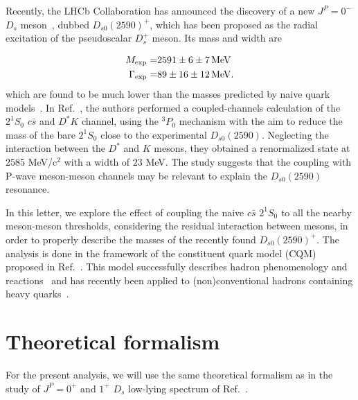 \documentclass[aps, prd, floatfix, twocolumn, superscriptaddress, nofootinbib]{revtex4-1}
\begin{document}
Recently, the LHCb Collaboration has announced the discovery of a new $J^P=0^-$ $D_s$ meson~\cite{LHCb:2020gnv}, dubbed $D_{s0}(2590)^+$, which has been proposed as the radial excitation of the pseudoscalar $D_s^+$ meson.
Its mass and width are

\begin{align}
 M_{\rm exp}=& 2591\pm 6\pm 7\,{\rm MeV}\nonumber \\
 \Gamma_{\rm exp}=& 89\pm 16\pm 12\,{\rm MeV}.
\end{align}
%
which are found to be much lower than the masses predicted by naive quark models~\cite{Godfrey:1985xj}. In Ref.~\cite{Xie:2021dwe}, the authors performed
a coupled-channels calculation of the $2^1S_0$ $c\bar s$ and $D^*K$ channel, using the $^3P_0$ mechanism with the aim to reduce the mass of the bare $2^1S_0$ close to the experimental $D_{s0}(2590)$. Neglecting the interaction between the $D^*$ and $K$ mesons, they obtained a renormalized state at $2585$ MeV/c$^2$ with a width of $23$ MeV. The study suggests that the coupling with P-wave meson-meson channels may be relevant to explain the $D_{s0}(2590)$ resonance.

In this letter, we explore the effect of coupling the naive $c\bar s$ $2^1S_0$ to all the nearby meson-meson thresholds, considering the residual interaction between mesons,
 in order to properly describe the masses of the recently found $D_{s0}(2590)^+$. The analysis is done in the framework of the constituent quark model (CQM) proposed in  Ref.~\cite{Vijande:2004he,Valcarce:2005em}. This model successfully describes hadron phenomenology and
reactions~\cite{Fernandez:1992xs, Garcilazo:2001md, Vijande:2004at} and has
recently been applied to (non)conventional hadrons containing heavy quarks~\cite{Segovia:2011zza, Ortega:2012cx, Ortega:2016pgg,
Ortega:2020tng,Ortega:2021zgk}.


\section{Theoretical formalism}
\label{sec:Theory}

For the present analysis, we will use the same theoretical formalism as in the study of $J^P=0^+$ and $1^+$ $D_s$ low-lying spectrum of Ref.~\cite{Ortega:2016mms}.

\end{document}
